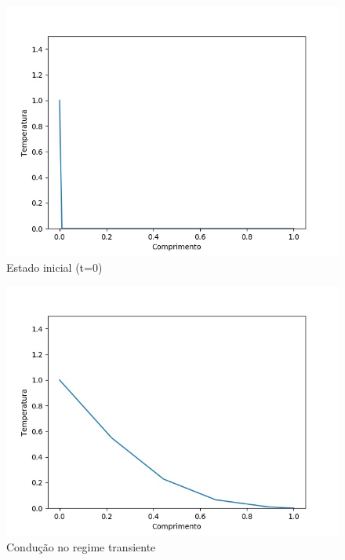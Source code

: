 \documentclass[journal]{IEEEtran}
\begin{document}
		\begin{figure}[H]
			\begin{center}
				\includegraphics[scale=0.3]{res1-1}
				\caption{Estado inicial (t=0)}
			\end{center}
		\end{figure}
		\begin{figure}[H]
			\begin{center}
				\includegraphics[scale=0.3]{res1-2}
				\caption{Condução no regime transiente}
			\end{center}
		\end{figure}
\end{document}

